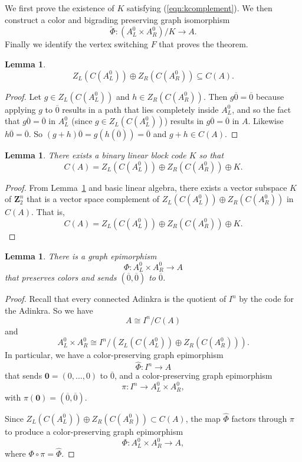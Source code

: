 \documentclass[12pt,twoside,singlespace]{article}
\numberwithin{equation}{section}
\newtheorem{lem}[equation]{Lemma}
\theoremstyle{definition}
\newcommand{\ZZ}{\mathbf{Z}}
\renewcommand{\vec}[1]{\mathbf{#1}}
\begin{document}
We first prove the existence of $K$ satisfying (\ref{eqn:kcomplement}).  We then construct a color and bigrading preserving graph isomorphism
\[\tilde{\Phi}:(A_L^0\times A_R^0)/K\to A.\]
Finally we identify the vertex switching $F$ that proves the theorem.


\begin{lem}
\label{lem:cplus}
\[Z_L(C(A_L^0))\oplus Z_R(C(A_R^0)) \subseteq C(A).\]
\end{lem}
\begin{proof}
Let $g\in Z_L(C(A_L^0))$ and $h\in Z_R(C(A_R^0))$.  Then $g\overline{0}=\overline{0}$ because applying $g$ to $\overline{0}$ results in a path that lies completely inside $A_L^0$, and so the fact that $g\overline{0}=\overline{0}$ in $A_L^0$ (since $g\in Z_L(C(A_L^0))$) results in $g\overline{0}=\overline{0}$ in $A$.  Likewise $h\overline{0}=\overline{0}$.  So $(g+h)\overline{0}=g(h(\overline{0}))=\overline{0}$ and $g+h\in C(A)$.
\end{proof}

\begin{lem}
\label{lem:existk}
There exists a binary linear block code $K$ so that
\[C(A)=Z_L(C(A_L^0))\oplus Z_R(C(A_R^0))\oplus K.
\]
\end{lem}
\begin{proof}
From Lemma~\ref{lem:cplus} and basic linear algebra, there exists a vector subspace $K$ of $\ZZ_2^n$ that is a vector space complement of
$Z_L(C(A_L^0))\oplus Z_R(C(A_R^0))$ in $C(A)$.  That is,
\[C(A)=Z_L(C(A_L^0))\oplus Z_R(C(A_R^0))\oplus K.\]
\end{proof}


\begin{lem}
\label{lem:mainepicolors}
There is a graph epimorphism
\[\Phi:A_L^0\times A_R^0 \to A\]
that preserves colors and sends $(\overline{0},\overline{0})$ to $\overline{0}$.
\end{lem}
\begin{proof}
Recall that every connected Adinkra is the quotient of $I^n$ by the code for the Adinkra.\cite{d2l:omni}  So we have
\[A\cong I^n/C(A)\]
and
\[A_L^0\times A_R^0 \cong I^n/(Z_L(C(A_L^0))\oplus Z_R(C(A_R^0))).\]
In particular, we have a color-preserving graph epimorphism
\[\hat{\Phi}:I^n\to A\]
that sends $\vec{0}=(0,\ldots,0)$ to $\overline{0}$, and a color-preserving graph epimorphism
\[\pi:I^n\to A_L^0\times A_R^0,\]
with $\pi(\vec{0})=(\overline{0},\overline{0})$.

Since $Z_L(C(A_L^0))\oplus Z_R(C(A_R^0))\subset C(A)$, the map $\hat{\Phi}$ factors through $\pi$ to produce a color-preserving graph epimorphism
\[\Phi:A_L^0\times A_R^0\to A,\]
where $\Phi\circ\pi=\hat{\Phi}$.
\end{proof}
\end{document}
